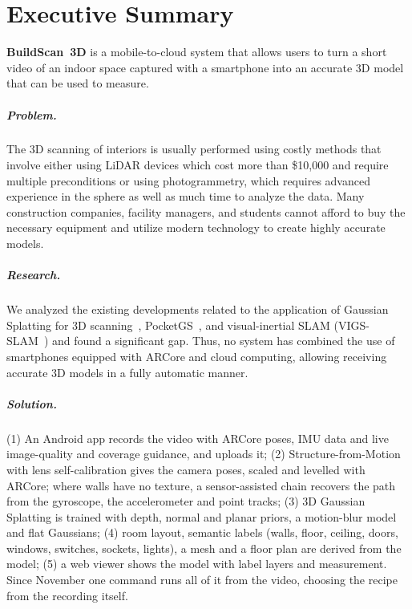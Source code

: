 \chapter*{Executive Summary}

\textbf{BuildScan~3D} is a mobile-to-cloud system that allows users to turn a short video of an indoor space captured with a smartphone into an accurate 3D model that can be used to measure.

\paragraph{Problem.} The 3D scanning of interiors is usually performed using costly methods that involve either using LiDAR devices which cost more than \$10,000 and require multiple preconditions or using photogrammetry, which requires advanced experience in the sphere as well as much time to analyze the data. Many construction companies, facility managers, and students cannot afford to buy the necessary equipment and utilize modern technology to create highly accurate models.

\paragraph{Research.} We analyzed the existing developments related to the application of Gaussian Splatting for 3D scanning~\cite{kerbl3dgs}, PocketGS~\cite{pocketgs}, and visual-inertial SLAM (VIGS-SLAM~\cite{vigsslam}) and found a significant gap. Thus, no system has combined the use of smartphones equipped with ARCore and cloud computing, allowing receiving accurate 3D models in a fully automatic manner.

\paragraph{Solution.} (1) An Android app records the video with ARCore poses, IMU data and live image-quality and
coverage guidance, and uploads it; (2) Structure-from-Motion with lens self-calibration gives the camera poses,
scaled and levelled with ARCore; where walls have no texture, a sensor-assisted chain recovers the path from the
gyroscope, the accelerometer and point tracks; (3) 3D Gaussian Splatting is trained with depth, normal and planar
priors, a motion-blur model and flat Gaussians; (4) room layout, semantic labels (walls, floor, ceiling, doors,
windows, switches, sockets, lights), a mesh and a floor plan are derived from the model; (5) a web viewer shows the
model with label layers and measurement. Since November one command runs all of it from the video, choosing the
recipe from the recording itself.

